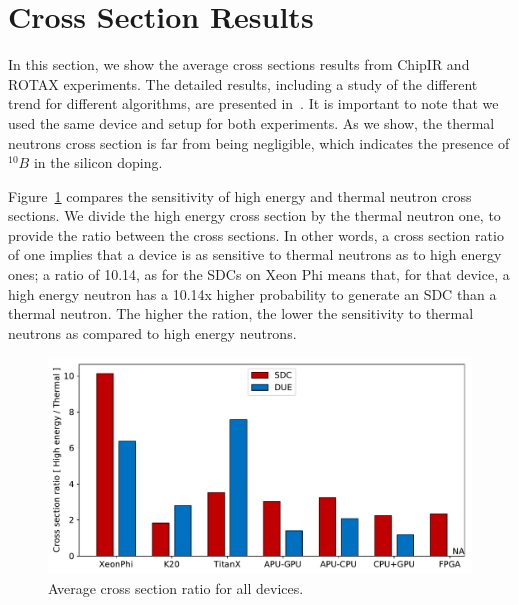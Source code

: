 %

\section{Cross Section Results}
\label{sec_results}


In this section, we show the average cross sections results from ChipIR and ROTAX experiments. The detailed results, including a study of the different trend for different algorithms, are presented in~\cite{jsc2020}. It is important to note that we used the same device and setup for both experiments. As we show, the thermal neutrons cross section is far from being negligible, which indicates the presence of $^{10}B$ in the silicon doping.

Figure~\ref{cs_ratio} compares the sensitivity of high energy and thermal neutron cross sections. We divide the high energy cross section by the thermal neutron one, to provide the ratio between the cross sections. In other words, a cross section ratio of one implies that a device is as sensitive to thermal neutrons as to high energy ones; a ratio of 10.14, as for the SDCs on Xeon Phi means that, for that device, a high energy neutron has a 10.14x higher probability to generate an SDC than a thermal neutron. The higher the ration, the lower the sensitivity to thermal neutrons as compared to high energy neutrons.

\begin{figure}[th]
	\centering
	\includegraphics[width=1.0\columnwidth]{./figs/cross_section_ratio.pdf}
	\caption{Average cross section ratio for all devices.}
	\label{cs_ratio}
\end{figure}


